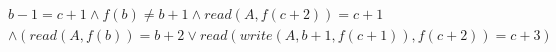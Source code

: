 \begin{align*}
%
& %
b - 1 = c + 1
%
\land
%
f(b)  \neq  b + 1
%
\land
%
\mathit{read}(A,f(c + 2)) = c + 1
~\\~
& %
%
\land
%
(\mathit{read}(A,f(b)) = b + 2 \lor \mathit{read}(\mathit{write}(A,b + 1,f(c + 1)),f(c + 2)) = c + 3)
%
\end{align*}
